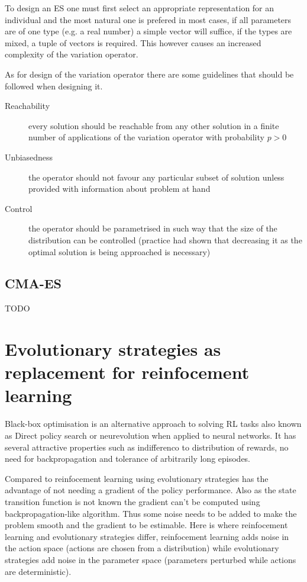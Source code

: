 To design an ES one must first select an appropriate representation for an individual and the most natural one is prefered in most cases, if all parameters are of one type (e.g. a real number) a simple vector will suffice, if the types are mixed, a tuple of vectors is required. This however causes an increased complexity of the variation operator.

As for design of the variation operator there are some guidelines that should be followed when designing it.
\begin{description}
    \item[Reachability] every solution should be reachable from any other solution in a finite number of applications of the variation operator with probability $p > 0$
    \item[Unbiasedness] the operator should not favour any particular subset of solution unless provided with information about problem at hand
    \item[Control] the operator should be parametrised in such way that the size of the distribution can be controlled (practice had shown that decreasing it as the optimal solution is being approached is necessary) 
\end{description}
\cite{Schwefel1995}
\cite{Rudolph2012}

\subsection{CMA-ES}
\label{subsec:cma-es}
TODO \cite{Hansen06}
\section{Evolutionary strategies as replacement for reinfocement learning}
\label{sec:es-reinf}

Black-box optimisation is an alternative approach to solving RL tasks also known as Direct policy search or neurevolution when applied to neural networks. It has several attractive properties such as indifferenco to distribution of rewards, no need for backpropagation and tolerance of arbitrarily long episodes.

Compared to reinfocement learning using evolutionary strategies has the advantage of not needing a gradient of the policy performance. Also as the state transition function is not known  the gradient can't be computed using backpropagation-like algorithm. Thus some noise needs to be added to make the problem smooth and the gradient to be estimable. Here is where reinfocement learning and evolutionary strategies differ, reinfocement learning adds noise in the action space (actions are chosen from a distribution) while evolutionary strategies add noise in the parameter space (parameters perturbed while actions are deterministic).

